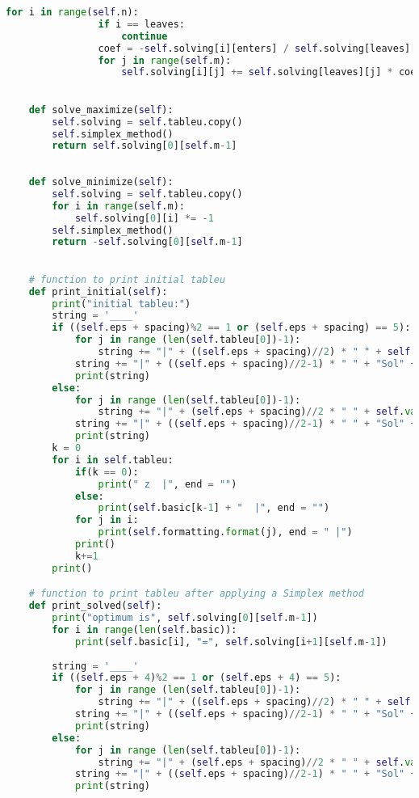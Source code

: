 \documentclass[12pt, legalpaper]{exam}
\begin{document}
\begin{lstlisting}[language=Python, caption=Программа на Python, label=lst:python-code]
            for i in range(self.n):
                if i == leaves:
                    continue
                coef = -self.solving[i][enters] / self.solving[leaves][enters]
                for j in range(self.m):
                    self.solving[i][j] += self.solving[leaves][j] * coef

    
    def solve_maximize(self):
        self.solving = self.tableu.copy()
        self.simplex_method()
        return self.solving[0][self.m-1]
        
    
    def solve_minimize(self): 
        self.solving = self.tableu.copy()
        for i in range(self.m):
            self.solving[0][i] *= -1
        self.simplex_method()
        return -self.solving[0][self.m-1]

    
    # function to print initial tableu
    def print_initial(self):
        print("initial tableu:")
        string = '____'
        if ((self.eps + spacing)%2 == 1 or (self.eps + spacing) == 5):
            for j in range (len(self.tableu[0])-1):
                string += "|" + ((self.eps + spacing)//2) * " " + self.vars[j] + ((self.eps + spacing)//2) * " "
            string += "|" + ((self.eps + spacing)//2-1) * " " + "Sol" + (self.eps + spacing)//2 * " " + "|"
            print(string)
        else: 
            for j in range (len(self.tableu[0])-1):
                string += "|" + (self.eps + spacing)//2 * " " + self.vars[j] + ((self.eps + spacing)//2-1) * " "
            string += "|" + ((self.eps + spacing)//2-1) * " " + "Sol" + ((self.eps + spacing)//2-1) * " " + "|"
            print(string)
        k = 0
        for i in self.tableu:
            if(k == 0):
                print(" z  |", end = "")
            else:
                print(self.basic[k-1] + "  |", end = "")
            for j in i:
                print(self.formatting.format(j), end = " |")
            print()
            k+=1
        print()

    # function to print tableu after applying a Simplex method
    def print_solved(self):
        print("optimum is", self.solving[0][self.m-1])
        for i in range(len(self.basic)):
            print(self.basic[i], "=", self.solving[i+1][self.m-1])
            
        string = '____'
        if ((self.eps + 4)%2 == 1 or (self.eps + 4) == 5):
            for j in range (len(self.tableu[0])-1):
                string += "|" + ((self.eps + spacing)//2) * " " + self.vars[j] + ((self.eps + spacing)//2) * " "
            string += "|" + ((self.eps + spacing)//2-1) * " " + "Sol" + (self.eps + spacing)//2 * " " + "|"
            print(string)
        else: 
            for j in range (len(self.tableu[0])-1):
                string += "|" + (self.eps + spacing)//2 * " " + self.vars[j] + ((self.eps + spacing)//2-1) * " "
            string += "|" + ((self.eps + spacing)//2-1) * " " + "Sol" + ((self.eps + spacing)//2-1) * " " + "|"
            print(string)


\end{lstlisting}
\end{document}

